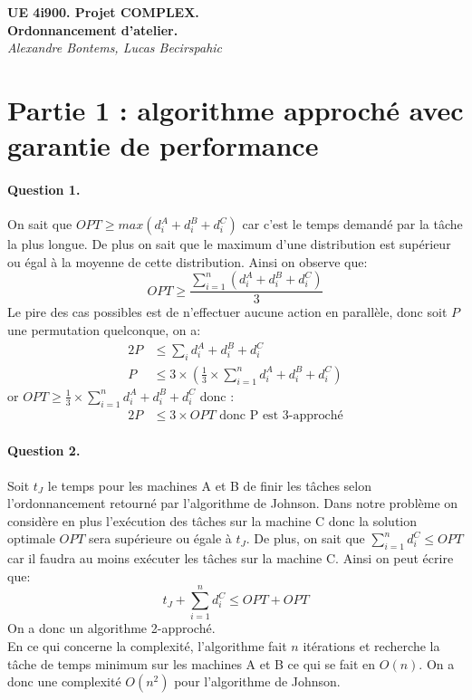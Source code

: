 \documentclass[a4paper, 10pt]{article}
\begin{document}
	\begin{center}
		\textbf{UE 4i900. Projet COMPLEX.}\\
		\textbf{Ordonnancement d'atelier.}\\[0.5cm]
		\textit{Alexandre Bontems, Lucas Becirspahic}
	\end{center}
	
	\section*{Partie 1 : algorithme approché avec garantie de performance}
	
		\paragraph{Question 1.}{On sait que  $OPT \geq max\left( d_i^A + d_i^B + d_i^C \right)$ car c'est le temps demandé par la tâche la plus longue. De plus on sait que le maximum d'une distribution est supérieur ou égal à la moyenne de cette distribution. Ainsi on observe que:
		\begin{equation*}
			OPT \geq \frac{\sum_{i=1}^n \left( d_i^A + d_i^B + d_i^C \right)}{3}
		\end{equation*}
		Le pire des cas possibles est de n'effectuer aucune action en parallèle, donc soit $P$ une permutation quelconque, on a:
		\begin{alignat*}{2}
			P &\le \sum_{i} d_i^A + d_i^B + d_i^C \\
			P &\le 3 \times \left( \frac{1}{3} \times \sum_{i=1}^n d_i^A + d_i^B + d_i^C \right)
		\end{alignat*}
		or $OPT \geq \frac{1}{3} \times \sum_{i=1}^n d_i^A + d_i^B + d_i^C$ donc :
		\begin{alignat*}{2}
			P &\leq 3 \times OPT \text{ donc P est 3-approché}
		\end{alignat*}}
		
		\paragraph{Question 2.}{Soit $t_J$ le temps pour les machines A et B de finir les tâches selon l'ordonnancement retourné par l'algorithme de Johnson. Dans notre problème on considère en plus l'exécution des tâches sur la machine C donc la solution optimale $OPT$ sera supérieure ou égale à $t_J$. De plus, on sait que $\sum_{i=1}^n d_i^C \le OPT$ car il faudra au moins exécuter les tâches sur la machine C. Ainsi on peut écrire que:
		\begin{equation*}
			t_J + \sum_{i=1}^n d_i^C \le OPT + OPT
		\end{equation*}
		On a donc un algorithme 2-approché.\\[0.35cm]
		En ce qui concerne la complexité, l'algorithme fait $n$ itérations et recherche la tâche de temps minimum sur les machines A et B ce qui se fait en $O(n)$. On a donc une complexité $O(n^2)$ pour l'algorithme de Johnson.
		}
		
\end{document}
